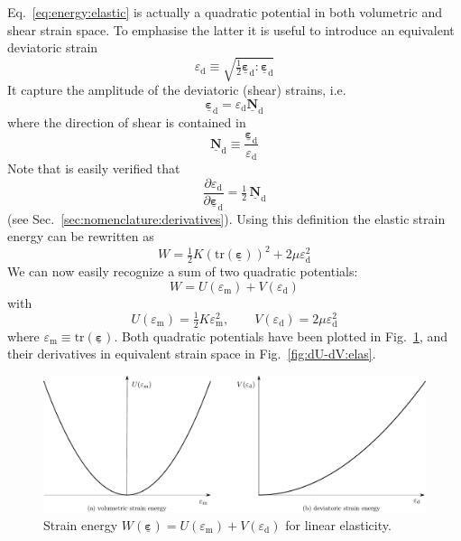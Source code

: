 \documentclass[times,namecite]{goose-article}
\newcommand\T[1]{\underline{\bm{{#1}}}}
\begin{document}
Eq.~\eqref{eq:energy:elastic} is actually a quadratic potential in both volumetric and shear strain space. To emphasise the latter it is useful to introduce an equivalent deviatoric strain
\begin{equation}
  \varepsilon_\mathrm{d} \equiv \sqrt{ \tfrac{1}{2} \T{\varepsilon}_\mathrm{d} : \T{\varepsilon}_\mathrm{d} }
\end{equation}
It capture the amplitude of the deviatoric (shear) strains, i.e.\
\begin{equation}
  \T{\varepsilon}_\mathrm{d} = \varepsilon_\mathrm{d} \T{N}_\mathrm{d}
\end{equation}
where the direction of shear is contained in
\begin{equation}
  \T{N}_\mathrm{d} \equiv \frac{\T{\varepsilon}_\mathrm{d}}{\varepsilon_\mathrm{d}}
\end{equation}
Note that is easily verified that
\begin{equation}
  \frac{\partial \varepsilon_\mathrm{d}}{\partial \T{\varepsilon}_\mathrm{d}} = \tfrac{1}{2} \, \T{N}_\mathrm{d}
\end{equation}
(see Sec.~\ref{sec:nomenclature:derivatives}). Using this definition the elastic strain energy can be rewritten as
\begin{equation}
  W = \tfrac{1}{2} K \left( \text{tr} ( \T{\varepsilon} ) \right)^2 + 2 \mu \varepsilon_\mathrm{d}^2
\end{equation}
We can now easily recognize a sum of two quadratic potentials:
\begin{equation}
  W = U ( \varepsilon_\mathrm{m} ) + V ( \varepsilon_\mathrm{d} )
\end{equation}
with
\begin{equation}
\label{eq:potentials:elastic}
  U ( \varepsilon_\mathrm{m} ) = \tfrac{1}{2} K \varepsilon_\mathrm{m}^2,
  \qquad
  V ( \varepsilon_\mathrm{d} ) = 2 \mu \varepsilon_\mathrm{d}^2
\end{equation}
where $\varepsilon_\mathrm{m} \equiv \text{tr} ( \T{\varepsilon} )$. Both quadratic potentials have been plotted in Fig.~\ref{fig:U-V:elas}, and their derivatives in equivalent strain space in Fig.~\ref{fig:dU-dV:elas}.

\begin{figure}[htp]
  \centering
  \includegraphics[width=1.\textwidth]{figures/potential_U-V_elas}
  \caption{Strain energy $W ( \T{\varepsilon} ) = U ( \varepsilon_\mathrm{m} ) + V ( \varepsilon_\mathrm{d} )$ for linear elasticity.}
  \label{fig:U-V:elas}
\end{figure}
\end{document}
